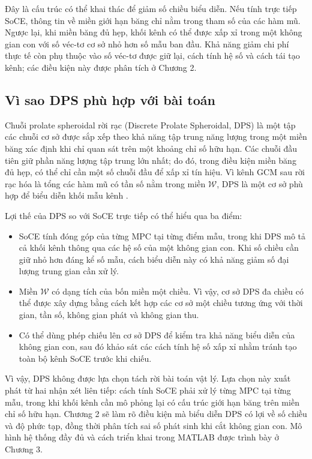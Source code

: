 Đây là cấu trúc có thể khai thác để giảm số chiều biểu diễn. Nếu tính trực tiếp SoCE, thông tin về miền giới hạn băng chỉ nằm trong tham số của các hàm mũ. Ngược lại, khi miền băng đủ hẹp, khối kênh có thể được xấp xỉ trong một không gian con với số véc-tơ cơ sở nhỏ hơn số mẫu ban đầu. Khả năng giảm chi phí thực tế còn phụ thuộc vào số véc-tơ được giữ lại, cách tính hệ số và cách tái tạo kênh; các điều kiện này được phân tích ở Chương 2.

\subsection{Vì sao DPS phù hợp với bài toán}
\label{subsec:ch1_why_dps}

Chuỗi prolate spheroidal rời rạc (Discrete Prolate Spheroidal, DPS) là một tập các chuỗi cơ sở được sắp xếp theo khả năng tập trung năng lượng trong một miền băng xác định khi chỉ quan sát trên một khoảng chỉ số hữu hạn. Các chuỗi đầu tiên giữ phần năng lượng tập trung lớn nhất; do đó, trong điều kiện miền băng đủ hẹp, có thể chỉ cần một số chuỗi đầu để xấp xỉ tín hiệu. Vì kênh GCM sau rời rạc hóa là tổng các hàm mũ có tần số nằm trong miền \(\mathcal{W}\), DPS là một cơ sở phù hợp để biểu diễn khối mẫu kênh \cite{Slepian1978,Kaltenberger2007}.

Lợi thế của DPS so với SoCE trực tiếp có thể hiểu qua ba điểm:
\begin{itemize}
    \item SoCE tính đóng góp của từng MPC tại từng điểm mẫu, trong khi DPS mô tả cả khối kênh thông qua các hệ số của một không gian con. Khi số chiều cần giữ nhỏ hơn đáng kể số mẫu, cách biểu diễn này có khả năng giảm số đại lượng trung gian cần xử lý.
    \item Miền \(\mathcal{W}\) có dạng tích của bốn miền một chiều. Vì vậy, cơ sở DPS đa chiều có thể được xây dựng bằng cách kết hợp các cơ sở một chiều tương ứng với thời gian, tần số, không gian phát và không gian thu.
    \item Có thể dùng phép chiếu lên cơ sở DPS để kiểm tra khả năng biểu diễn của không gian con, sau đó khảo sát các cách tính hệ số xấp xỉ nhằm tránh tạo toàn bộ kênh SoCE trước khi chiếu.
\end{itemize}

Vì vậy, DPS không được lựa chọn tách rời bài toán vật lý. Lựa chọn này xuất phát từ hai nhận xét liên tiếp: cách tính SoCE phải xử lý từng MPC tại từng mẫu, trong khi khối kênh cần mô phỏng lại có cấu trúc giới hạn băng trên miền chỉ số hữu hạn. Chương 2 sẽ làm rõ điều kiện mà biểu diễn DPS có lợi về số chiều và độ phức tạp, đồng thời phân tích sai số phát sinh khi cắt không gian con. Mô hình hệ thống đầy đủ và cách triển khai trong MATLAB được trình bày ở Chương 3.

